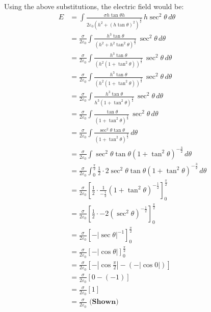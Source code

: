 \documentclass[11pt]{article}
\begin{document}
Using the above substitutions, the electric field would be:
\begin{align*}
E &= \int \frac{\sigma h \tan \theta h}{2 \varepsilon_0 (h^2 + (h \tan \theta)^2)^{\frac{3}{2}}} \, h \sec^2 \theta \, d \theta \\
&= \frac{\sigma}{2 \varepsilon_0} \int \frac{h^3 \tan \theta}{(h^2 + h^2 \tan^2 \theta )^{\frac{3}{2}}} \, \sec^2 \theta \, d \theta \\
&= \frac{\sigma}{2 \varepsilon_0} \int \frac{h^3 \tan \theta}{(h^2(1 + \tan^2 \theta ))^{\frac{3}{2}}} \, \sec^2 \theta \, d \theta \\
&= \frac{\sigma}{2 \varepsilon_0} \int \frac{h^3 \tan \theta}{(h^2(1 + \tan^2 \theta ))^{\frac{3}{2}}} \, \sec^2 \theta \, d \theta \\
&= \frac{\sigma}{2 \varepsilon_0} \int \frac{h^3 \tan \theta}{h^3(1 + \tan^2 \theta)^{\frac{3}{2}}} \, \sec^2 \theta \, d \theta \\
&= \frac{\sigma}{2 \varepsilon_0} \int \frac{\tan \theta}{(1 + \tan^2 \theta)^{\frac{3}{2}}} \, \sec^2 \theta \, d \theta \\
&= \frac{\sigma}{2 \varepsilon_0} \int \frac{\sec^2 \theta \tan \theta}{(1 + \tan^2 \theta)^{\frac{3}{2}}} \, d \theta \\
&= \frac{\sigma}{2 \varepsilon_0} \int \sec^2 \theta \tan \theta (1 + \tan^2 \theta)^{-\frac{3}{2}} \, d \theta \\
&= \frac{\sigma}{2 \varepsilon_0} \int_0^{\frac{\pi}{2}} \frac{1}{2} \cdot 2 \sec^2 \theta \tan \theta (1 + \tan^2 \theta)^{-\frac{3}{2}} \, d \theta \\
&= \frac{\sigma}{2 \varepsilon_0} \left[\frac{1}{2} \cdot \frac{1}{-\frac{1}{2}} (1 + \tan^2 \theta)^{-\frac{1}{2}} \right]_0^{\frac{\pi}{2}} \\
&= \frac{\sigma}{2 \varepsilon_0} \left[\frac{1}{2} \cdot -2 (\sec^2 \theta)^{-\frac{1}{2}} \right]_0^{\frac{\pi}{2}} \\
&= \frac{\sigma}{2 \varepsilon_0} \left[-|\sec \theta|^{-1} \right]_0^{\frac{\pi}{2}} \\
&= \frac{\sigma}{2 \varepsilon_0} \left[-|\cos \theta| \right]_0^{\frac{\pi}{2}} \\
&= \frac{\sigma}{2 \varepsilon_0} \left[-\left|\cos \frac{\pi}{2} \right| - (-|\cos 0|) \right] \\
&= \frac{\sigma}{2 \varepsilon_0} [0 - (-1)] \\
&= \frac{\sigma}{2 \varepsilon_0} [1] \\
&= \frac{\sigma}{2 \varepsilon_0} \textbf{ (Shown)} \\
\end{align*}
\end{document}
